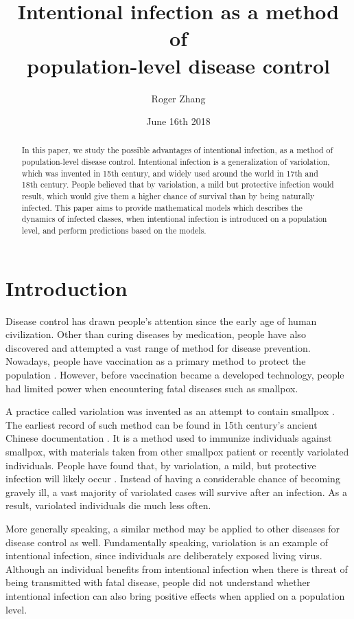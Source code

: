 \documentclass[12pt]{article}
\title{Intentional infection as a method of\\population-level disease control}
\author{Roger Zhang}
\date{June 16th 2018}
\begin{document}
\linenumbers
\maketitle
\begin{abstract}
In this paper, we study the possible advantages of intentional infection, as a method of population-level disease control. Intentional infection is a generalization of variolation, which was invented in 15th century, and widely used around the world in 17th and 18th century. People believed that by variolation, a mild but protective infection would result, which would give them a higher chance of survival than by being naturally infected. This paper aims to provide mathematical models which describes the dynamics of infected classes, when intentional infection is introduced on a population level, and perform predictions based on the models.
\end{abstract}
\clearpage
\tableofcontents
\clearpage
\section{Introduction}
Disease control has drawn people's attention since the early age of human civilization. Other than curing diseases by medication, people have also discovered and attempted a vast range of method for disease prevention. Nowadays, people have vaccination as a primary method to protect the population \cite{bloom2006priorities}. However, before vaccination became a developed technology, people had limited power when encountering fatal diseases such as smallpox.

A practice called variolation was invented as an attempt to contain smallpox \cite{henderson1976eradication}. The earliest record of such method can be found in 15th century's ancient Chinese documentation \cite{leung2011variolation}. It is a method used to immunize individuals against smallpox, with materials taken from other smallpox patient or recently variolated individuals. People have found that, by variolation, a mild, but protective infection will likely occur \cite{leung2011variolation}. Instead of having a considerable chance of becoming gravely ill, a vast majority of variolated cases will survive after an infection. As a result, variolated individuals die much less often.

More generally speaking, a similar method may be applied to other diseases for disease control as well. Fundamentally speaking, variolation is an example of intentional infection, since individuals are deliberately exposed living virus. Although an individual benefits from intentional infection when there is threat of being transmitted with fatal disease, people did not understand whether intentional infection can also bring positive effects when applied on a population level. 
\end{document}
